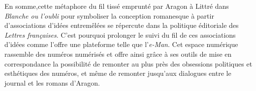 En somme,cette métaphore du fil tissé emprunté par Aragon à Littré dans \emph{Blanche ou l'oubli} pour symboliser la conception romanesque à partir d'associations d'idées entremêlées se répercute dans la politique éditoriale des \emph{Lettres françaises}. C'est pourquoi prolonger le suivi du fil de ces associations d'idées comme l'offre une plateforme telle que l'\emph{e-Man}. Cet espace numérique rassemble des numéros numérisés et offre ainsi grâce à ses outils de mise en correspondance la possibilité de remonter au plus près des obsessions politiques et esthétiques des numéros, et même de remonter jusqu'aux dialogues entre le journal et les romans d'Aragon. 